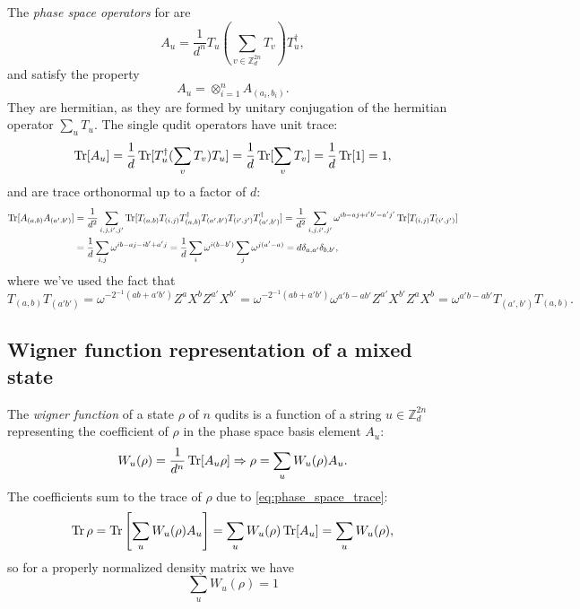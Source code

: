\documentclass{article}
\begin{document}
The \textit{phase space operators} for are
\begin{equation}\label{eq:phase_space_ops}A_u=\frac{1}{d^n}T_u\left(\sum_{v\in\mathbb Z_d^{2n}} T_v\right)T_u^\dagger,\end{equation}
and satisfy the property
\begin{equation}A_u=\otimes_{i=1}^n A_{(a_i,b_i)}.\end{equation}
They are hermitian, as they are formed by unitary conjugation of the hermitian operator $\sum_u T_u$. The single qudit operators have unit trace:
\begin{equation}\label{eq:phase_space_trace}\operatorname{Tr}[A_u]=\frac{1}{d}\operatorname{Tr}[T_u^\dagger (\sum_v T_v) T_u]=\frac{1}{d}\operatorname{Tr}[\sum_v T_v]=\frac{1}{d}\operatorname{Tr}[1]=1,\end{equation}
and are trace orthonormal up to a factor of $d$:
\begin{align}\operatorname{Tr}[A_{(a,b)}A_{(a',b')}]&=\frac{1}{d^2}\sum_{i,j,i',j'}\operatorname{Tr}[T_{(a,b)}T_{(i,j)}T_{(a,b)}^\dagger T_{(a',b')}T_{(i',j')}T_{(a',b')}^\dagger]=\frac{1}{d^2}\sum_{i,j,i',j'}\omega^{ib-aj+i'b'-a'j'}\operatorname{Tr}[T_{(i,j)}T_{(i',j')}]\\&=\frac{1}{d}\sum_{i,j}\omega^{ib-aj-ib'+a'j}=\frac{1}{d}\sum_i \omega^{i(b-b')}\sum_j \omega^{j(a'-a)}=d\delta_{a,a'}\delta_{b,b'},\label{eq:phase_space_norm}\end{align}
where we've used the fact that
\begin{equation}T_{(a,b)}T_{(a'b')}=\omega^{-2^{-1}(ab+a'b')}Z^aX^bZ^{a'}X^{b'}=\omega^{-2^{-1}(ab+a'b')}\omega^{a'b-ab'}Z^{a'}X^{b'}Z^aX^b=\omega^{a'b-ab'}T_{(a',b')}T_{(a,b)}.\end{equation}

\subsection{Wigner function representation of a mixed state}

\label{sec:wigner_fct}

The \textit{wigner function} of a state $\rho$ of $n$ qudits is a function of a string $u\in\mathbb Z_d^{2n}$ representing the coefficient of $\rho$ in the phase space basis element $A_u$:
\begin{equation}\label{eq:wigner_repr}W_u(\rho)=\frac{1}{d^n}\operatorname{Tr}[A_u \rho]\Rightarrow \rho=\sum_u W_u(\rho)A_u.\end{equation}
The coefficients sum to the trace of $\rho$ due to \eqref{eq:phase_space_trace}:
\begin{equation}\operatorname{Tr} \rho=\operatorname{Tr}\left[\sum_u W_u(\rho)A_u\right]=\sum_u W_u(\rho)\operatorname{Tr}[A_u]=\sum_u W_u(\rho),\end{equation}
so for a properly normalized density matrix we have
\begin{equation}\sum_u W_u(\rho)=1\end{equation}
\end{document}
